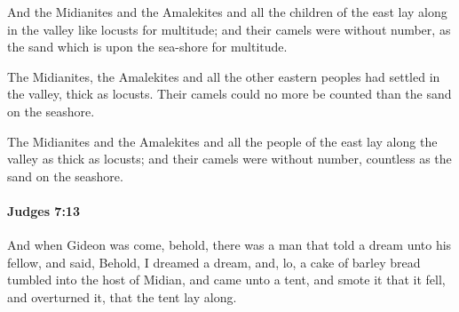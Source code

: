 			\begin{versebox}
					\item[BHS] 
					\item[ASV] And the Midianites and the Amalekites and all the children of the east lay along in the valley like locusts for multitude; and their camels were without number, as the sand which is upon the sea-shore for multitude.
					\item[NIV] The Midianites, the Amalekites and all the other eastern peoples had settled in the valley, thick as locusts. Their camels could no more be counted than the sand on the seashore.
					\item[NRSV] The Midianites and the Amalekites and all the people of the east lay along the valley as thick as locusts; and their camels were without number, countless as the sand on the seashore.
			\end{versebox}

		\paragraph{Judges 7:13} %
			\label{JUDGES-7-13}

			And when Gideon was come, behold, there was a man that told a dream unto his fellow, and said, Behold, I dreamed a dream, and, lo, a cake of barley bread tumbled into the host of Midian, and came unto a tent, and smote it that it fell, and overturned it, that the tent lay along.

